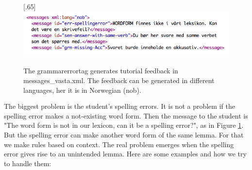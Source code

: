 \documentclass[a4paper,12pt]{article}
\begin{document}
\begin{figure}[htbp]
\begin{center}
\scalebox{.65}[.65]{\includegraphics{img/messages_vasta.png}}
\caption{The grammarerrortag generates tutorial feedback in messages\_vasta.xml. The feedback can be generated in different languages, her it is in Norwegian (nob).}
\label{messv}
\end{center}
\end{figure}

\newpage
The biggest problem is the student's spelling errors. It is not a problem if the spelling error makes a not-existing word form. Then the message to the student is  "The word form is not in our lexicon, can it be a spelling error?", as in Figure \ref{messv}. But the spelling error can make another word form of the same lemma. For that we make rules based on context. The real problem emerges when the spelling error gives rise to an unintended lemma. Here are some examples and how we try to handle them:\\
\end{document}
